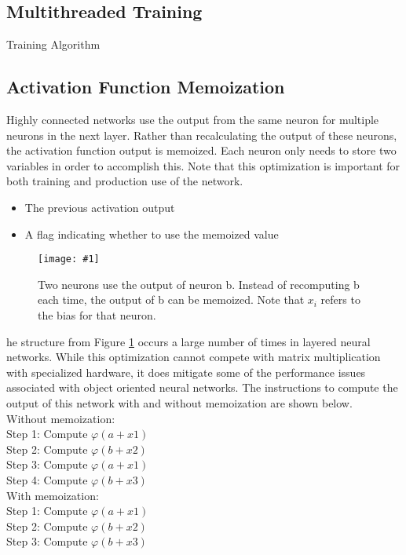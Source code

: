 \documentclass[twocolumn]{article}
\newcommand\pcode[5]{
	\begin{algorithm}[H] \caption{#1} \label{pcode:#2} \begin{algorithmic}[1]
		\Function{#3}{#4} 
			#5
		\EndFunction
	\end{algorithmic} \end{algorithm}
}
\newcommand\fig[5]{
	\begin{figure}[H]
		\begin{center}\texttt{[image: \#1]}\end{center}
		\caption{#4}\label{fig:#2}
	\end{figure}
}
\newcommand\figRef[1]{Figure \ref{fig:#1}\xspace}
\begin{document}
\subsection{Multithreaded Training}
\pcode{Training Algorithm}{train}{train}{}{}

\subsection{Activation Function Memoization}

Highly connected networks use the output from the same neuron for multiple neurons in the next layer. Rather than recalculating the output of these neurons, the activation function output is memoized. Each neuron only needs to store two variables in order to accomplish this. Note that this optimization is important for both training and production use of the network.

\begin{itemize}
        \item The previous activation output 
        \item A flag indicating whether to use the memoized value
\end{itemize}

\fig{images/memoization.png}{memoization}{0.4}{
Two neurons use the output of neuron b. Instead of recomputing b each time, the output of b can be memoized. Note that $x_i$ refers to the bias for that neuron.
}

The structure from \figRef{memoization} occurs a large number of times in layered neural networks. While this optimization cannot compete with matrix multiplication with specialized hardware, it does mitigate some of the performance issues associated with object oriented neural networks. The instructions to compute the output of this network with and without memoization are shown below. \\

\noindent Without memoization: \\
\indent Step 1: Compute $\varphi(a+x1)$ \\
\indent Step 2: Compute $\varphi(b+x2)$ \\
\indent Step 3: Compute $\varphi(a+x1)$ \\
\indent Step 4: Compute $\varphi(b+x3)$ \\

\noindent With memoization: \\
\indent Step 1: Compute $\varphi(a+x1)$ \\
\indent Step 2: Compute $\varphi(b+x2)$ \\
\indent Step 3: Compute $\varphi(b+x3)$
\end{document}
